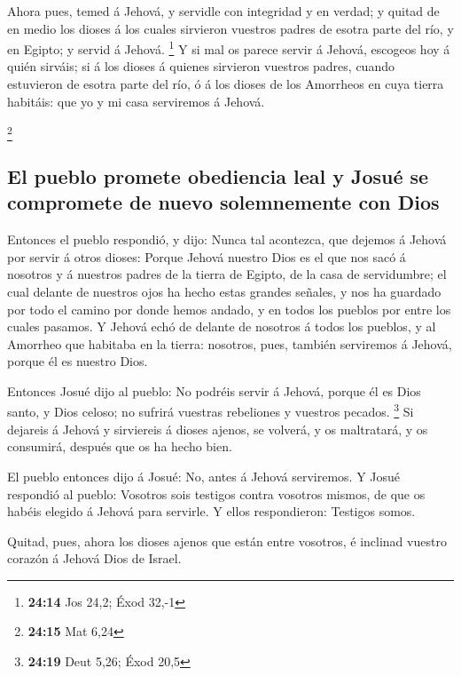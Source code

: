  Ahora pues, temed á Jehová, y servidle con integridad y
en verdad; y quitad de en medio los dioses á los cuales sirvieron
vuestros padres de esotra parte del río, y en Egipto; y servid á Jehová.
\footnote{\textbf{24:14} Jos 24,2; Éxod 32,-1}  Y si mal
os parece servir á Jehová, escogeos hoy á quién sirváis; si á los dioses
á quienes sirvieron vuestros padres, cuando estuvieron de esotra parte
del río, ó á los dioses de los Amorrheos en cuya tierra habitáis: que yo
y mi casa serviremos á Jehová.

\footnote{\textbf{24:15} Mat 6,24}

\hypertarget{el-pueblo-promete-obediencia-leal-y-josuuxe9-se-compromete-de-nuevo-solemnemente-con-dios}{%
\subsection{El pueblo promete obediencia leal y Josué se compromete de
nuevo solemnemente con
Dios}\label{el-pueblo-promete-obediencia-leal-y-josuuxe9-se-compromete-de-nuevo-solemnemente-con-dios}}

 Entonces el pueblo respondió, y dijo: Nunca tal
acontezca, que dejemos á Jehová por servir á otros dioses:
 Porque Jehová nuestro Dios es el que nos sacó á nosotros
y á nuestros padres de la tierra de Egipto, de la casa de servidumbre;
el cual delante de nuestros ojos ha hecho estas grandes señales, y nos
ha guardado por todo el camino por donde hemos andado, y en todos los
pueblos por entre los cuales pasamos.  Y Jehová echó de
delante de nosotros á todos los pueblos, y al Amorrheo que habitaba en
la tierra: nosotros, pues, también serviremos á Jehová, porque él es
nuestro Dios.

 Entonces Josué dijo al pueblo: No podréis servir á
Jehová, porque él es Dios santo, y Dios celoso; no sufrirá vuestras
rebeliones y vuestros pecados. \footnote{\textbf{24:19} Deut 5,26; Éxod
  20,5}  Si dejareis á Jehová y sirviereis á dioses
ajenos, se volverá, y os maltratará, y os consumirá, después que os ha
hecho bien.

 El pueblo entonces dijo á Josué: No, antes á Jehová
serviremos.  Y Josué respondió al pueblo: Vosotros sois
testigos contra vosotros mismos, de que os habéis elegido á Jehová para
servirle. Y ellos respondieron: Testigos somos.

 Quitad, pues, ahora los dioses ajenos que están entre
vosotros, é inclinad vuestro corazón á Jehová Dios de Israel.


